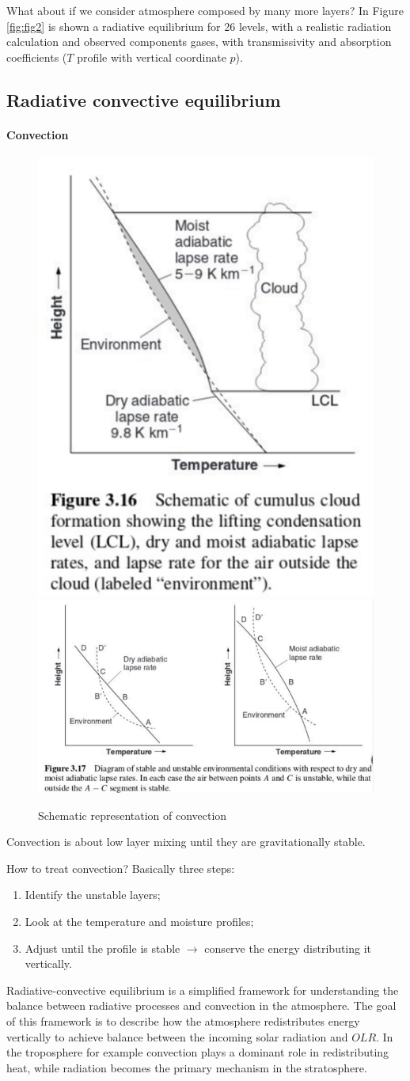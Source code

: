 What about if we consider atmosphere composed by many more layers?
In Figure \ref{fig:fig2} is shown a radiative equilibrium for 26 levels, with a realistic radiation calculation and observed components gases, with transmissivity and absorption coefficients ($T$ profile with vertical coordinate $p$).


\subsection{Radiative convective equilibrium}\label{subsec:convection adjustments}
\paragraph{Convection}
\begin{figure}[htpb]
	\centering
	\includegraphics[width=0.28\linewidth]{uploads/Screenshot 2024-11-20 130640.png}\quad \includegraphics[width=0.5\linewidth]{uploads/Screenshot 2024-11-20 130727.png}
	\caption{Schematic representation of convection}
	\label{fig:enter-label}
\end{figure}
Convection is about low layer mixing until they are gravitationally stable.

How to treat convection? Basically three steps:
\begin{enumerate}
	\item Identify the unstable layers;
	\item Look at the temperature and moisture profiles;
	\item Adjust until the profile is stable $\rightarrow$ conserve the energy distributing it vertically.
\end{enumerate}
Radiative-convective equilibrium is a simplified framework for understanding the balance between radiative processes and convection in the atmosphere. The goal of this framework is to describe how the atmosphere redistributes energy vertically to achieve balance between the incoming solar radiation and $OLR$. In the troposphere for example convection plays a dominant role in redistributing heat, while radiation becomes the primary mechanism in the stratosphere.


